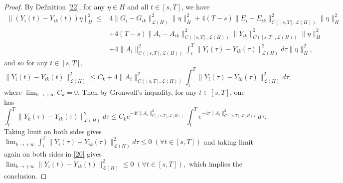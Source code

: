 \documentclass[10pt]{article}
\begin{document}
\begin{proof}
 By Definition \ref{22}, for any $\eta\in H$ and all $t\in[s,T]$, we have
\begin{align*}
\|(Y_{i}(t)-Y_{ik}(t))\eta\|_{H}^2 
 \leq &4 \|G_i-G_{ik}\|_{\mathcal{L}(H)}^2\|\eta\|_H^2+4(T-s)\|E_i-E_{ik}\|^2_{C([s,T],\mathcal{L}(H))}\|\eta\|_H^2\\
 &+4(T-s)\|A_i-A_{ik}\|^2_{ C([s,T],\mathcal{L}(H))}\|Y_{ik}\|^2_{ C([s,T],\mathcal{L}(H))}\|\eta\|_H^2\\
   &+4\|A_i\|^2_{ C([s,T],\mathcal{L}(H))}\int_t^T\|Y_{i}(\tau)-Y_{ik}(\tau)\|^2_{\mathcal{L}(H)}d\tau\|\eta\|_H^2,
\end{align*}
and so for any $ t\in[s,T]$,
\begin{equation}\label{20}
\|Y_{i}(t)-Y_{ik}(t)\|_{\mathcal{L}(H)}^2\leq C_k+4\|A_i\|^2_{ C([s,T],\mathcal{L}(H))}\int_t^T\|Y_{i}(\tau)-Y_{ik}(\tau)\|^2_{\mathcal{L}(H)}d\tau,
\end{equation}
where $\lim_{k\rightarrow+\infty}C_k=0$. Then by Gronwall's inquality, for any $ t\in[s,T]$, one has
$$
\int_t^T\|Y_{k}(\tau)-Y_{ik}(\tau)\|^2_{\mathcal{L}(H)}d\tau\leq C_ke^{-4 t\|A_i\|^2_{ C([s,T],\mathcal{L}(H))}}\int_t^Te^{-4\tau\|A_i\|^2_{ C([s,T],\mathcal{L}(H))}}d\tau.
$$
Taking  limit on both sides gives
$\lim_{k\rightarrow+\infty}\int_t^T\|Y_{i}(\tau)-Y_{ik}(\tau)\|^2_{\mathcal{L}(H)}d\tau\leq0 \; (\forall t\in[s,T])$
and taking  limit again on both sides in \eqref{20} gives
$\lim_{k\rightarrow+\infty}\|Y_{i}(t)-Y_{ik}(t)\|_{\mathcal{L}(H)}^2\leq0 \; (\forall t\in[s,T]),$
which implies the conclusion.
\end{proof}
\end{document}
